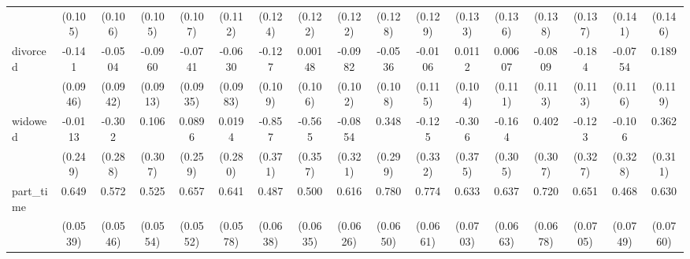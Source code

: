 {\begin{tabular}{l*{16}{c}}
                    &     (0.105)         &     (0.106)         &     (0.105)         &     (0.107)         &     (0.112)         &     (0.124)         &     (0.122)         &     (0.122)         &     (0.128)         &     (0.129)         &     (0.133)         &     (0.136)         &     (0.138)         &     (0.137)         &     (0.141)         &     (0.146)         \\
[1em]
divorced            &      -0.141         &     -0.0504         &     -0.0960         &     -0.0741         &     -0.0630         &      -0.127         &     0.00148         &     -0.0982         &     -0.0536         &     -0.0106         &      0.0112         &     0.00607         &     -0.0809         &      -0.184         &     -0.0754         &       0.189         \\
                    &    (0.0946)         &    (0.0942)         &    (0.0913)         &    (0.0935)         &    (0.0983)         &     (0.109)         &     (0.106)         &     (0.102)         &     (0.108)         &     (0.115)         &     (0.104)         &     (0.111)         &     (0.113)         &     (0.113)         &     (0.116)         &     (0.119)         \\
[1em]
widowed             &     -0.0113         &      -0.302         &       0.106         &      0.0896         &      0.0194         &      -0.857\sym{*}  &      -0.565         &     -0.0854         &       0.348         &      -0.125         &      -0.306         &      -0.164         &       0.402         &      -0.123         &      -0.106         &       0.362         \\
                    &     (0.249)         &     (0.288)         &     (0.307)         &     (0.259)         &     (0.280)         &     (0.371)         &     (0.357)         &     (0.321)         &     (0.299)         &     (0.332)         &     (0.375)         &     (0.305)         &     (0.307)         &     (0.327)         &     (0.328)         &     (0.311)         \\
[1em]
part\_time           &       0.649\sym{***}&       0.572\sym{***}&       0.525\sym{***}&       0.657\sym{***}&       0.641\sym{***}&       0.487\sym{***}&       0.500\sym{***}&       0.616\sym{***}&       0.780\sym{***}&       0.774\sym{***}&       0.633\sym{***}&       0.637\sym{***}&       0.720\sym{***}&       0.651\sym{***}&       0.468\sym{***}&       0.630\sym{***}\\
                    &    (0.0539)         &    (0.0546)         &    (0.0554)         &    (0.0552)         &    (0.0578)         &    (0.0638)         &    (0.0635)         &    (0.0626)         &    (0.0650)         &    (0.0661)         &    (0.0703)         &    (0.0663)         &    (0.0678)         &    (0.0705)         &    (0.0749)         &    (0.0760)         \\

\end{tabular}}
